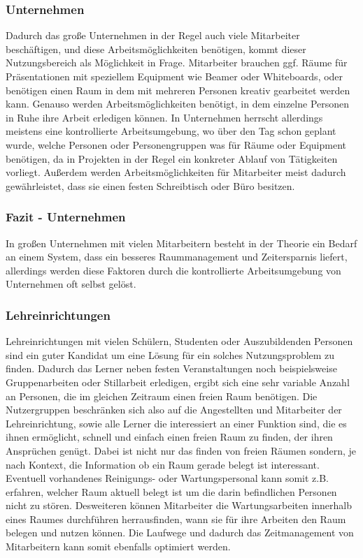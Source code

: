\subsubsection{Unternehmen}
\label{sec:Unternehmen}

Dadurch das große Unternehmen in der Regel auch viele Mitarbeiter beschäftigen,
und diese Arbeitsmöglichkeiten benötigen, kommt dieser Nutzungsbereich als
Möglichkeit in Frage. Mitarbeiter brauchen ggf. Räume für Präsentationen mit
speziellem Equipment wie Beamer oder Whiteboards, oder benötigen einen Raum in
dem mit mehreren Personen kreativ gearbeitet werden kann. Genauso werden
Arbeitsmöglichkeiten benötigt, in dem einzelne Personen in Ruhe ihre Arbeit
erledigen können. In Unternehmen herrscht allerdings meistens eine
kontrollierte Arbeitsumgebung, wo über den Tag schon geplant wurde, welche
Personen oder Personengruppen was für Räume oder Equipment benötigen, da in
Projekten in der Regel ein konkreter Ablauf von Tätigkeiten vorliegt. Außerdem
werden Arbeitsmöglichkeiten für Mitarbeiter meist dadurch gewährleistet, dass
sie einen festen Schreibtisch oder Büro besitzen.

\subsubsection{Fazit - Unternehmen}
\label{sec:Fazit_Unternehmen}

In großen Unternehmen mit vielen Mitarbeitern besteht in der Theorie ein Bedarf
an einem System, dass ein besseres Raummanagement und Zeitersparnis liefert,
allerdings werden diese Faktoren durch die kontrollierte Arbeitsumgebung von
Unternehmen oft selbst gelöst.

\subsubsection{Lehreinrichtungen}
\label{sec:Lehreinrichtungen}

Lehreinrichtungen mit vielen Schülern, Studenten oder Auszubildenden Personen
sind ein guter Kandidat um eine Lösung für ein solches Nutzungsproblem zu
finden. Dadurch das Lerner neben festen Veranstaltungen noch beispielsweise
Gruppenarbeiten oder Stillarbeit erledigen, ergibt sich eine sehr variable
Anzahl an Personen, die im gleichen Zeitraum einen freien Raum benötigen.
Die Nutzergruppen beschränken sich also auf die Angestellten und Mitarbeiter
der Lehreinrichtung, sowie alle Lerner die interessiert an einer Funktion sind,
die es ihnen ermöglicht, schnell und einfach einen freien Raum zu finden, der
ihren Ansprüchen genügt.
Dabei ist nicht nur das finden von freien Räumen sondern, je nach Kontext, die
Information ob ein Raum gerade belegt ist interessant. Eventuell vorhandenes
Reinigungs- oder Wartungspersonal kann somit z.B. erfahren, welcher Raum
aktuell belegt ist um die darin befindlichen Personen nicht zu stören.
Desweiteren können Mitarbeiter die Wartungsarbeiten innerhalb eines Raumes
durchführen herrausfinden, wann sie für ihre Arbeiten den Raum belegen und
nutzen können. Die Laufwege und dadurch das Zeitmanagement von Mitarbeitern
kann somit ebenfalls optimiert werden.

